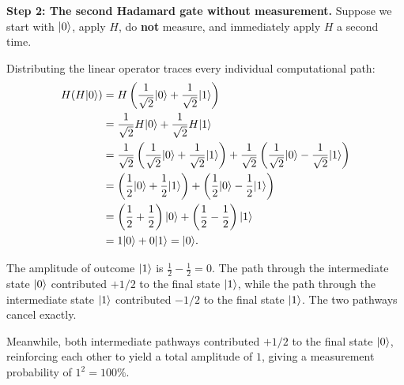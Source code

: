 \textbf{Step 2: The second Hadamard gate without measurement.}
Suppose we start with
$\lvert 0 \rangle$, apply $H$, do \textbf{not} measure, and immediately apply $H$ a second time.

Distributing the linear operator traces every individual computational path:
\begin{align*}
  H(H\lvert 0 \rangle) &= H\left(\frac{1}{\sqrt{2}}\lvert 0 \rangle + \frac{1}{\sqrt{2}}\lvert 1 \rangle\right) \\
  &= \frac{1}{\sqrt{2}}H\lvert 0 \rangle + \frac{1}{\sqrt{2}}H\lvert 1 \rangle \\
  &= \frac{1}{\sqrt{2}}\left(\frac{1}{\sqrt{2}}\lvert 0 \rangle + \frac{1}{\sqrt{2}}\lvert 1 \rangle\right)
   + \frac{1}{\sqrt{2}}\left(\frac{1}{\sqrt{2}}\lvert 0 \rangle - \frac{1}{\sqrt{2}}\lvert 1 \rangle\right) \\
  &= \left(\frac{1}{2}\lvert 0 \rangle + \frac{1}{2}\lvert 1 \rangle\right)
   + \left(\frac{1}{2}\lvert 0 \rangle - \frac{1}{2}\lvert 1 \rangle\right) \\
  &= \left(\frac{1}{2} + \frac{1}{2}\right)\lvert 0 \rangle + \left(\frac{1}{2} - \frac{1}{2}\right)\lvert 1 \rangle \\
  &= 1\lvert 0 \rangle + 0\lvert 1 \rangle = \lvert 0 \rangle.
\end{align*}

The amplitude of outcome $\lvert 1 \rangle$ is
$\frac{1}{2} - \frac{1}{2} = 0$. The path through the intermediate state $\lvert 0 \rangle$
contributed $+1/2$ to the final state $\lvert 1 \rangle$, while the path through the
intermediate state $\lvert 1 \rangle$ contributed $-1/2$ to the final state $\lvert 1 \rangle$. The two
pathways cancel exactly.

Meanwhile, both intermediate pathways contributed $+1/2$ to the final state $\lvert 0 \rangle$,
reinforcing each other to yield a total amplitude of $1$, giving a measurement
probability of $1^2 = 100\%$.

